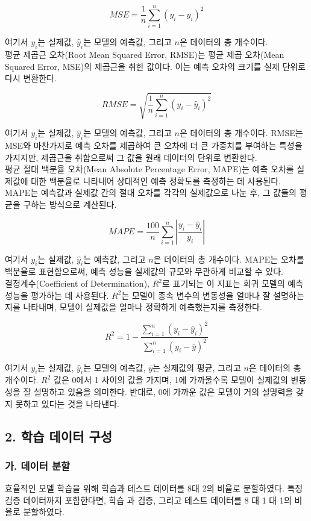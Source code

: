 \documentclass[11pt]{report}
\begin{document}
\[
MSE = \frac{1}{n} \sum_{i=1}^{n} (y_i - \hat{y}_i)^2
\]

여기서 \(y_i\)는 실제값, \(\hat{y}_i\)는 모델의 예측값, 그리고 \(n\)은 데이터의 총 개수이다. \\
\indent 평균 제곱근 오차(Root Mean Squared Error, RMSE)는 평균 제곱 오차(Mean Squared Error, MSE)의 제곱근을 취한 값이다. 
이는 예측 오차의 크기를 실제 단위로 다시 변환한다. 

\[
RMSE = \sqrt{\frac{1}{n} \sum_{i=1}^{n} (y_i - \hat{y}_i)^2}
\]

여기서 \(y_i\)는 실제값, \(\hat{y}_i\)는 모델의 예측값, 그리고 \(n\)은 데이터의 총 개수이다. 
RMSE는 MSE와 마찬가지로 예측 오차를 제곱하여 큰 오차에 더 큰 가중치를 부여하는 특성을 가지지만, 제곱근을 취함으로써 그 값을 원래 데이터의 단위로 변환한다. \\
\indent 평균 절대 백분율 오차(Mean Absolute Percentage Error, MAPE)는 예측 오차를 실제값에 대한 백분율로 나타내어 상대적인 예측 정확도를 측정하는 데 사용된다. 
MAPE는 예측값과 실제값 간의 절대 오차를 각각의 실제값으로 나눈 후, 그 값들의 평균을 구하는 방식으로 계산된다. 

\[
MAPE = \frac{100}{n} \sum_{i=1}^{n} \left| \frac{y_i - \hat{y}_i}{y_i} \right|
\]

여기서 \(y_i\)는 실제값, \(\hat{y}_i\)는 예측값, 그리고 \(n\)은 데이터의 총 개수이다. 
MAPE는 오차를 백분율로 표현함으로써, 예측 성능을 실제값의 규모와 무관하게 비교할 수 있다. \\
\indent 결정계수(Coefficient of Determination), \( R^2 \)로 표기되는 이 지표는 회귀 모델의 예측 성능을 평가하는 데 사용된다. 
\( R^2 \)는 모델이 종속 변수의 변동성을 얼마나 잘 설명하는지를 나타내며, 모델이 실제값을 얼마나 정확하게 예측했는지를 측정한다. 

\[
R^2 = 1 - \frac{\sum_{i=1}^{n} (y_i - \hat{y}_i)^2}{\sum_{i=1}^{n} (y_i - \bar{y})^2}
\]

여기서 \( y_i \)는 실제값, \(\hat{y}_i\)는 모델의 예측값, \(\bar{y}\)는 실제값의 평균, 그리고 \(n\)은 데이터의 총 개수이다. 
\( R^2 \) 값은 0에서 1 사이의 값을 가지며, 1에 가까울수록 모델이 실제값의 변동성을 잘 설명하고 있음을 의미한다. 
반대로, 0에 가까운 값은 모델이 거의 설명력을 갖지 못하고 있다는 것을 나타낸다. \\

\subsection*{2. 학습 데이터 구성}
\subsubsection*{가. 데이터 분할}
효율적인 모델 학습을 위해 학습과 테스트 데이터를 8대 2의 비율로 분할하였다. 
특정 검증 데이터까지 포함한다면, 학습 과 검증, 그리고 테스트 데이터를 8 대 1 대 1의 비율로 분할하였다. 
\end{document}
